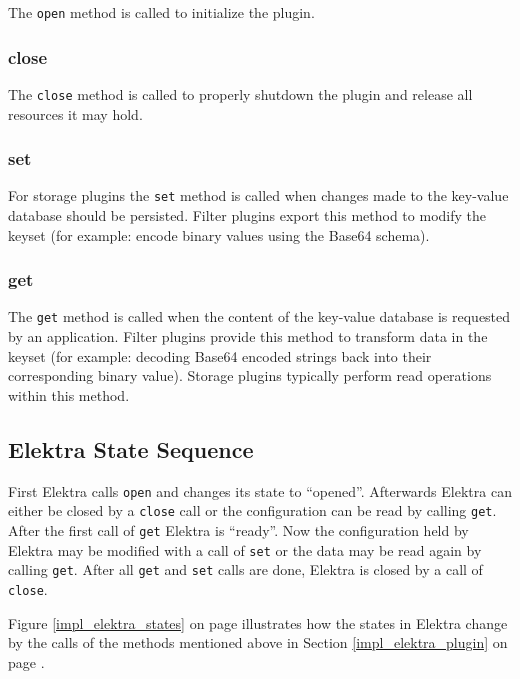 The \texttt{open} method is called to initialize the plugin.

\subsubsection{close}\label{close}

The \texttt{close} method is called to properly shutdown the plugin and
release all resources it may hold.

\subsubsection{set}\label{set}

For storage plugins the \texttt{set} method is called when changes made to the key-value
database should be persisted.
Filter plugins export this method to modify the keyset (for example: encode binary values using the Base64 schema).

\subsubsection{get}\label{get}

The \texttt{get} method is called when the content of the key-value
database is requested by an application.
Filter plugins provide this method to transform data in the keyset (for example: decoding Base64 encoded strings back into their corresponding binary value).
Storage plugins typically perform read operations within this method.

\subsection{Elektra State Sequence}

First Elektra calls \texttt{open} and changes its state to ``opened''.
Afterwards Elektra can either be closed by a \texttt{close} call or the configuration can be read by calling \texttt{get}.
After the first call of \texttt{get} Elektra is ``ready''.
Now the configuration held by Elektra may be modified with a call of \texttt{set} or the data may be read again by calling \texttt{get}.
After all \texttt{get} and \texttt{set} calls are done, Elektra is closed by a call of \texttt{close}.\cite{elektra-doc}

Figure \ref{impl_elektra_states} on page \pageref{impl_elektra_states} illustrates how the states in Elektra change by the calls of the methods mentioned above in Section \ref{impl_elektra_plugin} on page \pageref{impl_elektra_plugin}.

